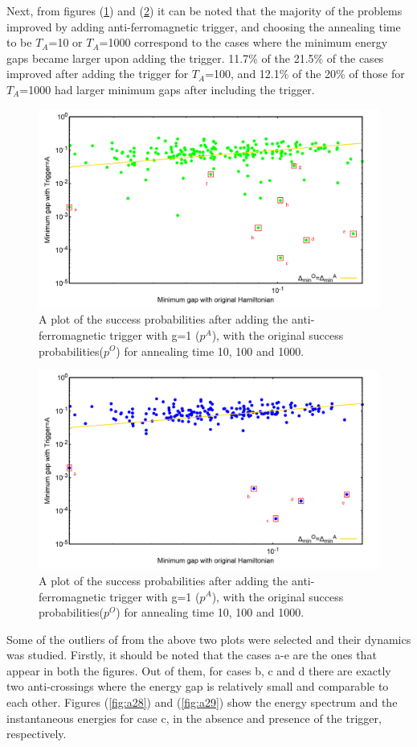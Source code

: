\documentclass[../main.tex]{subfiles}
\begin{document}
Next, from figures (\ref{fig:a26}) and (\ref{fig:a27}) it can be noted that the majority of the problems improved by adding anti-ferromagnetic trigger, and choosing the annealing time to be $T_A$=10 or $T_A$=1000 correspond to the cases where the minimum energy gaps became larger upon adding the trigger. 11.7\% of the   21.5\% of the cases improved after adding the trigger for $T_A$=100, and 12.1\% of the 20\% of those for $T_A$=1000 had larger minimum gaps after including the trigger.
\begin{figure}[H]
\centering 
\includegraphics[scale=0.43]{selected_T100_g1.png}
\caption{A plot of the success probabilities after adding the anti-ferromagnetic trigger with g=1 ($p^A$), with the original success probabilities($p^O$) for annealing time 10, 100 and 1000.}
\label{fig:a26}
\end{figure}
\begin{figure}[H]
\centering 
\includegraphics[scale=0.43]{selected_T1000_g1.png}
\caption{A plot of the success probabilities after adding the anti-ferromagnetic trigger with g=1 ($p^A$), with the original success probabilities($p^O$) for annealing time 10, 100 and 1000.}
\label{fig:a27}
\end{figure}
Some of the outliers of from the above two plots were selected and their dynamics was studied. Firstly, it should be noted that the cases a-e are the ones that appear in both the figures. Out of them, for cases b, c and d there are exactly two anti-crossings where the energy gap is relatively small and comparable to each other. Figures (\ref{fig:a28}) and (\ref{fig:a29}) show the energy spectrum and the instantaneous energies for case c, in the absence and presence of the trigger, respectively.
\end{document}

